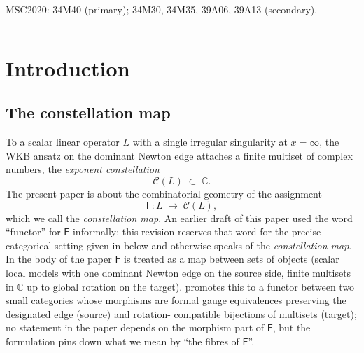 \documentclass[11pt,a4paper]{article}
\theoremstyle{plain}
\theoremstyle{definition}
\theoremstyle{remark}
\newcommand{\Cl}{\mathcal{C}}
\newcommand{\Fclass}{\mathsf{F}}
\begin{document}
\bigskip
\noindent\textsc{MSC2020:} 34M40 (primary); 34M30, 34M35, 39A06, 39A13
(secondary).

\tableofcontents

\bigskip\hrule\bigskip


\section{Introduction}\label{sec:intro}

\subsection{The constellation map}\label{ssec:intro-functor}

To a scalar linear operator $L$ with a single irregular singularity at
$x = \infty$, the WKB ansatz on the dominant Newton edge attaches a
finite multiset of complex numbers, the \emph{exponent constellation}
\[
   \Cl(L) \;\subset\; \mathbb{C}.
\]
The present paper is about the combinatorial geometry of the
assignment
\[
   \Fclass \colon L \;\longmapsto\; \Cl(L),
\]
which we call the \emph{constellation map}. An earlier draft of this
paper used the word ``functor'' for $\Fclass$ informally; this revision
reserves that word for the precise categorical setting given in
 below and otherwise speaks of the
\emph{constellation map}. In the body of the paper $\Fclass$ is treated
as a map between sets of objects (scalar local models with one dominant
Newton edge on the source side, finite multisets in $\mathbb{C}$ up to
global rotation on the target).  promotes this to
a functor between two small categories whose morphisms are formal gauge
equivalences preserving the designated edge (source) and rotation-
compatible bijections of multisets (target); no statement in the paper
depends on the morphism part of $\Fclass$, but the formulation pins
down what we mean by ``the fibres of $\Fclass$''.
\end{document}
